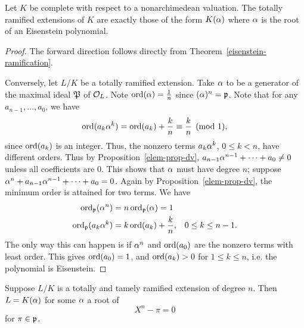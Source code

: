 \begin{thm}
Let $K$ be complete with respect to a nonarchimedean valuation. 
The totally ramified extensions of $K$ are exactly those of the form $K(\alpha)$ where $\alpha$ is the root of an Eisenstein polynomial.
\end{thm}
\begin{proof}
The forward direction follows directly from Theorem~\ref{eisenstein-ramification}.

Conversely, let $L/K$ be a totally ramified extension. Take $\alpha$ to be a generator of the maximal ideal $\mathfrak{P}$ of $\mathcal{O}_L$. Note $\operatorname{ord}(\alpha)=\frac{1}{n}$ since $(\alpha)^n=\mathfrak{p}$. Note that for any $a_{n-1},\ldots, a_0$, we have
\[
\operatorname{ord}(a_k\alpha^k)=\operatorname{ord}(a_k)+\frac{k}{n}\equiv \frac{k}{n}\pmod 1,
\]
since $\operatorname{ord}(a_k)$ is an integer. Thus, the nonzero terms $a_k\alpha^k$, $0\le k<n$, have different orders. Thus by Proposition~\ref{elem-prop-dv}, $a_{n-1}\alpha^{n-1}+\cdots +a_0\ne 0$ unless all coefficients are 0. This shows that $\alpha$ must have degree $n$; suppose $\alpha^n+a_{n-1}\alpha^{n-1}+\cdots +a_0=0$. Again by Proposition~\ref{elem-prop-dv}, the minimum order is attained for two terms. We have
\begin{align*}
\operatorname{ord}_{\mathfrak{p}}(\alpha^n)&=n\operatorname{ord}_{\mathfrak{p}}(\alpha)=1\\
\operatorname{ord}_{\mathfrak{p}}(a_k\alpha^k)&=k\operatorname{ord}(a_k)+\frac{k}{n},&0\le k\le n-1.
\end{align*}
The only way this can happen 
is if $\alpha^n$ and $\operatorname{ord}(a_0)$ are the nonzero terms with least order. This gives $\operatorname{ord}(a_0)=1$, and $\operatorname{ord}(a_k)>0$ for $1\le k\le n$, i.e. the polynomial is Eisenstein.
\end{proof}
\begin{thm}
Suppose $L/K$ is a totally and tamely ramified extension of degree $n$.
Then $L=K(\alpha)$ for some $\alpha$ a root of
\[
X^n-\pi=0
\]
for $\pi \in \mathfrak{p}$.
%
\end{thm}
